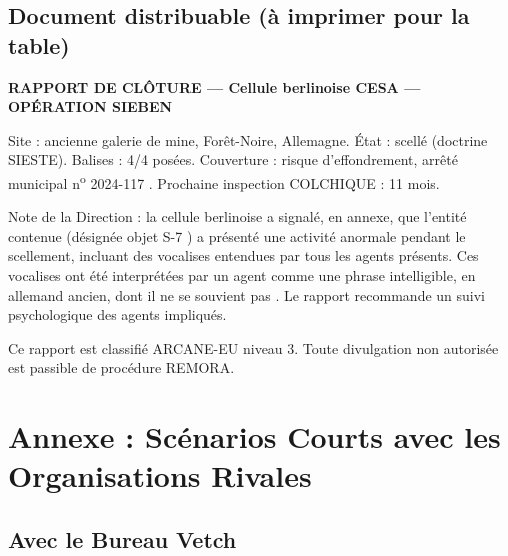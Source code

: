 \documentclass[10pt,a5paper,twoside]{book}
\begin{document}
\section{Document distribuable (à imprimer pour la table)}

\begin{shaded}
\begin{small}
\textbf{RAPPORT DE CLÔTURE --- Cellule berlinoise CESA --- OPÉRATION \og SIEBEN \fg}

Site : ancienne galerie de mine, Forêt-Noire, Allemagne. État : scellé (doctrine SIESTE). Balises : 4/4 posées. Couverture : \og risque d'effondrement, arrêté municipal n\textsuperscript{o} 2024-117 \fg. Prochaine inspection COLCHIQUE : 11 mois.

Note de la Direction : la cellule berlinoise a signalé, en annexe, que l'entité contenue (désignée \og objet S-7 \fg) a présenté une \og activité anormale \fg{} pendant le scellement, incluant des vocalises entendues par tous les agents présents. Ces vocalises ont été interprétées par un agent comme une \og phrase intelligible, en allemand ancien, dont il ne se souvient pas \fg. Le rapport recommande un suivi psychologique des agents impliqués.

Ce rapport est classifié ARCANE-EU niveau 3. Toute divulgation non autorisée est passible de procédure REMORA.
\end{small}
\end{shaded}


\chapter*{Annexe : Scénarios Courts avec les Organisations Rivales}

\section*{Avec le Bureau Vetch}
\end{document}
